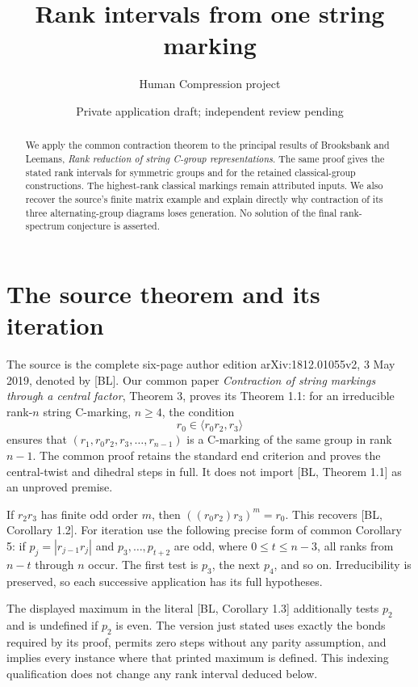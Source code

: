 \documentclass[a4paper,11pt]{article}
\title{Rank intervals from one string marking}
\author{Human Compression project}\date{Private application draft; independent review pending}
\newcommand{\gen}[1]{\langle#1\rangle}
\begin{document}
\maketitle
\begin{abstract}
We apply the common contraction theorem to the principal results of
Brooksbank and Leemans, \emph{Rank reduction of string C-group
representations}. The same proof gives the stated rank intervals for
symmetric groups and for the retained classical-group constructions.
The highest-rank classical markings remain attributed inputs. We also
recover the source's finite matrix example and explain directly why
contraction of its three alternating-group diagrams loses generation.
No solution of the final rank-spectrum conjecture is asserted.
\end{abstract}

\section{The source theorem and its iteration}
The source is the complete six-page author edition arXiv:1812.01055v2,
3 May 2019, denoted by [BL]. Our common paper \emph{Contraction of string
markings through a central factor}, Theorem 3, proves its Theorem 1.1:
for an irreducible rank-$n$ string C-marking, $n\geq4$, the condition
\[
 r_0\in\gen{r_0r_2,r_3}
\]
ensures that $(r_1,r_0r_2,r_3,\ldots,r_{n-1})$ is a C-marking of the
same group in rank $n-1$. The common proof retains the standard end
criterion and proves the central-twist and dihedral steps in full.
It does not import [BL, Theorem 1.1] as an unproved premise.

If $r_2r_3$ has finite odd order $m$, then
$((r_0r_2)r_3)^m=r_0$. This recovers [BL, Corollary 1.2].
For iteration use the following precise form of common Corollary 5:
if $p_j=|r_{j-1}r_j|$ and $p_3,\ldots,p_{t+2}$ are odd, where
$0\leq t\leq n-3$, all ranks from $n-t$ through $n$ occur.
The first test is $p_3$, the next $p_4$, and so on. Irreducibility is
preserved, so each successive application has its full hypotheses.

The displayed maximum in the literal [BL, Corollary 1.3] additionally
tests $p_2$ and is undefined if $p_2$ is even. The version just stated
uses exactly the bonds required by its proof, permits zero steps without
any parity assumption, and implies every instance where that printed
maximum is defined. This indexing qualification does not change any
rank interval deduced below.
\end{document}
